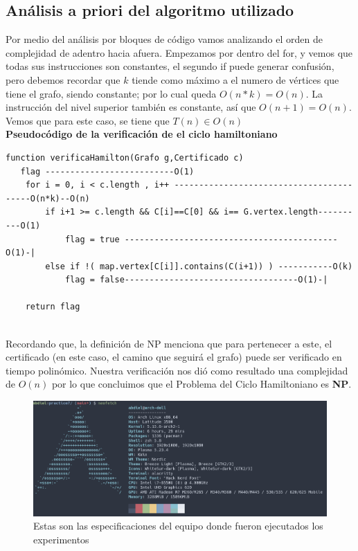 \documentclass{article}
\begin{document}
    \subsection{Análisis a priori del algoritmo utilizado }
    Por medio del análisis por bloques de código vamos analizando el orden de complejidad de adentro hacia afuera. Empezamos por dentro del for, y vemos que todas sus instrucciones son constantes, el segundo if puede generar confusión, pero debemos recordar que $k$ tiende como máximo a el numero de vértices que tiene el grafo, siendo constante; por lo cual queda $O(n*k) = O(n)$. La instrucción del nivel superior también es constante, así que $O(n+1) = O(n)$.\\Vemos que para este caso, se tiene que $T(n) \in O(n)$\\
     \textbf{Pseudocódigo de la verificación de el ciclo hamiltoniano}
        \begin{verbatim}
function verificaHamilton(Grafo g,Certificado c)
   flag --------------------------O(1)
    for i = 0, i < c.length , i++ -----------------------------------------O(n*k)--O(n)
        if i+1 >= c.length && C[i]==C[0] && i== G.vertex.length----------O(1)
            flag = true -------------------------------------------O(1)-|
        else if !( map.vertex[C[i]].contains(C(i+1)) ) -----------O(k)
            flag = false-----------------------------------O(1)-|
            
    return flag
        \end{verbatim}\\
    Recordando que, la definición de NP menciona que para pertenecer a este, el certificado (en este caso, el camino que seguirá el grafo) puede ser verificado en tiempo polinómico. Nuestra verificación nos dió como resultado una complejidad de $O(n)$ por lo que concluimos que el Problema del Ciclo Hamiltoniano es \textbf{NP}. 
    \begin{figure}[h!]
        \centering
        \includegraphics[width=1\textwidth]{specs.png}
        \caption{Estas son las especificaciones del equipo donde fueron ejecutados los experimentos}
        \label{fig:my_label}
    \end{figure}
\end{document}
